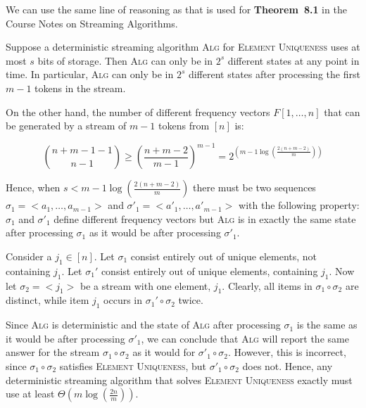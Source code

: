 We can use the same line of reasoning as that is used for \textbf{Theorem~8.1} in the Course Notes on Streaming Algorithms.

Suppose a deterministic streaming algorithm \textsc{Alg} for \textsc{Element Uniqueness} uses at most $s$ bits of storage.
Then \textsc{Alg} can only be in $2^s$ different states at any point in time.
In particular, \textsc{Alg} can only be in $2^s$ different states after processing the first $m - 1$ tokens in the stream.

On the other hand, the number of different frequency vectors $F[1, \ldots, n]$ that can be generated by a stream of $m - 1$ tokens from $\left[n\right]$ is:

\[
	{n + m - 1 - 1 \choose n - 1} \geq \left(\frac{n + m - 2}{m - 1}\right)^{m - 1} = 2^{(m - 1\log\left(\frac{2\left(n+m - 2\right)}{m}\right))}
\]

Hence, when $s < m - 1\log\left(\frac{2\left(n + m - 2\right)}{m}\right)$ there must be two sequences $\sigma_1 = <a_1, \ldots, a_{m - 1}>$ and $\sigma'_1 = <a'_1, \ldots, a'_{m - 1}>$ with the following property:
$\sigma_1$ and $\sigma'_1$ define different frequency vectors but \textsc{Alg} is in exactly the same state after processing $\sigma_1$ as it would be after processing $\sigma'_1$.

Consider a $j_1 \in [n]$.
Let $\sigma_1$ consist entirely out of unique elements, not containing $j_1$.
Let $\sigma_1'$ consist entirely out of unique elements, containing $j_1$.
Now let $\sigma_2 = <j_1>$ be a stream with one element, $j_1$.
Clearly, all items in $\sigma_1 \circ \sigma_2$ are distinct, while item $j_1$ occurs in $\sigma_1' \circ \sigma_2$ twice.

Since \textsc{Alg} is deterministic and the state of \textsc{Alg} after processing $\sigma_1$ is the same as it would be after processing $\sigma'_1$, we can conclude that \textsc{Alg} will report the same answer for the stream $\sigma_1 \circ \sigma_2$ as it would for $\sigma'_1 \circ \sigma_2$.
However, this is incorrect, since $\sigma_1 \circ \sigma_2$ satisfies \textsc{Element Uniqueness}, but $\sigma'_1 \circ \sigma_2$ does not.
Hence, any deterministic streaming algorithm that solves \textsc{Element Uniqueness} exactly must use at least $\Theta\left(m \log\left(\frac{2n}{m}\right)\right)$.
